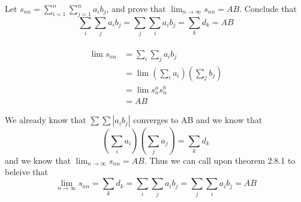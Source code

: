 Let $s_{nn} = \sum^{n}_{i=1} \sum^{n}_{j=1} a_i b_j$, and prove that
$\lim_{n\rightarrow\infty} s_{nn} = AB$.
Conclude that
$$
\sum_i \sum_j a_i b_j =
\sum_j \sum_i a_i b_j =
\sum_k d_k
= AB
$$
\\

\begin{align*}
\lim s_{nn} &= \sum_i \sum_j a_i b_j \\
&= \lim \left(\sum_i a_i\right) \left(\sum_j b_j\right) \\
&= \lim s^{a}_{n} s^{b}_{n} \\
&= AB
\end{align*}

We already know that $\sum \sum |a_i b_j|$ converges to AB and we know that
$$
\left(\sum_i a_i\right)\left(\sum_j a_j\right) =
\sum_k d_k
$$
and we know that $\lim_{n\rightarrow\infty} s_{nn} = AB$.
Thus we can call upon theorem 2.8.1 to beleive that
$$
\lim_{n\rightarrow\infty} s_{nn} =
\sum_k d_k =
\sum_i \sum_j a_i b_j =
\sum_j \sum_i a_i b_j =
AB
$$